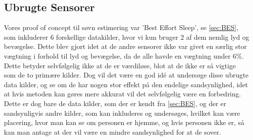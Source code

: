 \subsection{Ubrugte Sensorer}
Vores proof of concept til søvn estimering var 'Best Effort Sleep', se \cref{sec:BES}, som inkluderer 6 forskellige datakilder, hvor vi kun bruger 2 af dem nemlig lyd og bevægelse. 
Dette blev gjort idet at de andre sensorer ikke var givet en særlig stor vægtning i forhold til lyd og bevægelse, da de alle havde en vægtning under 6\%. 
Dette betyder selvfølgelig ikke at de er værdiløse, blot at de ikke er så vigtige som de to primære kilder.
Dog vil det være en god idé at undersøge disse ubrugte data kilder, og se om de har nogen stor effekt på den endelige sandsynlighed, idet at hvis metoden kan gøres mere akkurat vil det selvfølgelig være en forbedring. 
Dette er dog bare de data kilder, som der er kendt fra \cref{sec:BES}, og der er sandsynligvis andre kilder, som kan inkluderes og undersøges, hvilket kan være placering, hvor man kan se om personen er hjemme, og hvis personen ikke er, så kan man antage at der vil være en mindre sandsynlighed for at de sover. 